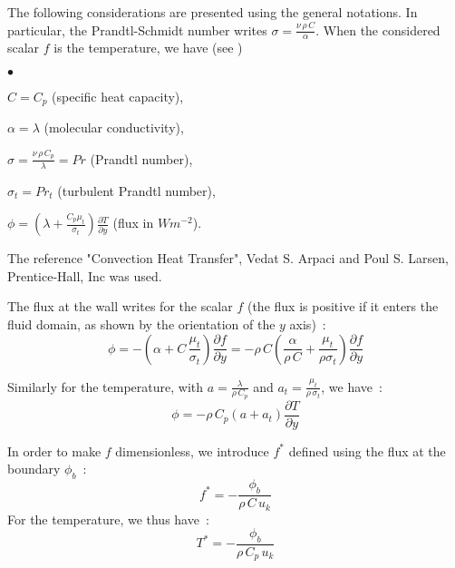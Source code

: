 The following considerations are presented using the general notations.
In particular, the Prandtl-Schmidt number writes 
$\sigma=\displaystyle\frac{\nu\,\rho\,C}{\alpha}$.
When the considered scalar $f$ is the temperature, 
we have (see )
\begin{list}{$\bullet$}{}
\item $C=C_p$ (specific heat capacity),
\item $\alpha=\lambda$ (molecular conductivity),
\item $\sigma = \displaystyle\frac{\nu\,\rho\,C_p}{\lambda} = Pr$
       (Prandtl number),
\item $\sigma_t = Pr_t$ (turbulent Prandtl number),
\item $\phi=\left(\lambda+\displaystyle\frac{C_p\mu_t}{\sigma_t}\right)
        \displaystyle\frac{\partial T}{\partial y}$ (flux in $Wm^{-2}$).
\end{list}

The reference "Convection Heat Transfer",
Vedat S. Arpaci and Poul S. Larsen, Prentice-Hall, Inc was used.

The flux at the wall writes for the scalar $f$ (the flux is positive 
if it enters the fluid domain, as shown by the orientation of the 
$y$ axis)~:
\begin{equation}\label{Base_Clptur_Eq_Flux_scalaire}
\phi = -\left(\alpha+C\,\frac{\mu_t}{\sigma_t}\right)
                  \frac{\partial f}{\partial y}
     = -\rho\,C \left(\displaystyle\frac{\alpha}{\rho\,C}+
                                \frac{\mu_t}{\rho\sigma_t}\right)
                  \frac{\partial f}{\partial y}
\end{equation}

Similarly for the temperature, with   
 $a=\displaystyle\frac{\lambda}{\rho\,C_p}$ and
$a_t=\displaystyle\frac{\mu_t}{\rho\,\sigma_t}$,
we have~:
\begin{equation}
\phi = -\rho\,C_p(a+a_t)\frac{\partial T}{\partial y}
\end{equation}

In order to make $f$ dimensionless, we introduce $f^*$ defined using
the flux at the boundary  $\phi_b$~:
\begin{equation}
f^* = -\displaystyle\frac{\phi_b}{\rho\,C\,u_k}
\end{equation}
For the temperature, we thus have~:
\begin{equation}
T^* = -\displaystyle\frac{\phi_b}{\rho\,C_p\,u_k}
\end{equation}

